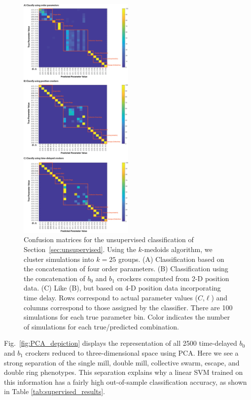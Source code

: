 \documentclass[%
 aip,
reprint,
 amsmath,amssymb,
 aps,
showkeys
]{revtex4-1}
\begin{document}
\begin{figure}
    \centering
    \includegraphics[width=0.5\textwidth]{unsup_conf_mat_tda_td.png}
    \caption{Confusion matrices for the unsupervised classification of Section~\ref{sec:unsupervised}. Using the $k$-medoids algorithm, we cluster simulations into $k=25$ groups. (A) Classification based on the concatenation of four order parameters. (B) Classification using the concatenation of $b_0$ and $b_1$ crockers computed from 2-D position data. (C) Like (B), but based on 4-D position data incorporating time delay. Rows correspond to actual parameter values ($C$,$\ell$) and columns correspond to those assigned by the classifier. There are 100 simulations for each true parameter bin. Color indicates the number of simulations for each true/predicted combination.}
    \label{fig:unsup_confusion}
\end{figure}

Fig.~\ref{fig:PCA_depiction} displays the representation of all 2500 time-delayed $b_0$ and $b_1$ crockers reduced to three-dimensional space using PCA. Here we see a strong separation of the single mill, double mill, collective swarm, escape, and double ring phenotypes. This separation explains why a linear SVM trained on this information has a fairly high out-of-sample classification accuracy, as shown in Table \ref{tab:supervised_results}.
\end{document}
